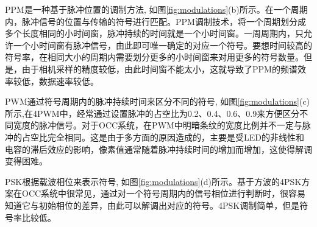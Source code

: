 PPM是一种基于脉冲位置的调制方法, 如图\ref{fig:modulations}(b)所示。在一个周期内，脉冲信号的位置与传输的符号进行匹配。PPM调制技术，将一个周期划分成多个长度相同的小时间窗，脉冲持续的时间就是一个小时间窗。一周周期内，只允许一个小时间窗有脉冲信号，由此即可唯一确定的对应一个符号。要想时间较高的符号率，在相同大小的周期内需要划分更多的小时间窗来对用更多的符号数量。但是，由于相机采样的精度较低，由此时间窗不能太小，这就导致了PPM的频谱效率较低，数据速率较低。

PWM通过符号周期内的脉冲持续时间来区分不同的符号, 如图\ref{fig:modulations}(c)所示,在4PWM中，经常通过设置脉冲的占空比为0.2、0.4、0.6、0.9来方便区分不同宽度的脉冲信号。对于OCC系统，在PWM中明暗条纹的宽度比例并不一定与脉冲的占空比完全相同。这是由于多方面的原因造成的，主要是受LED的非线性和电容的滞后效应的影响，像素值通常随着脉冲持续时间的增加而增加，这使得解调变得困难。


PSK根据载波相位来表示符号, 如图\ref{fig:modulations}(d)所示。基于方波的4PSK方案在OCC系统中很常见，通过对一个符号周期内的信号相位进行判断时，很容易知道它与初始相位的差异，由此可以解调出对应的符号。4PSK调制简单，但是符号率比较低。



